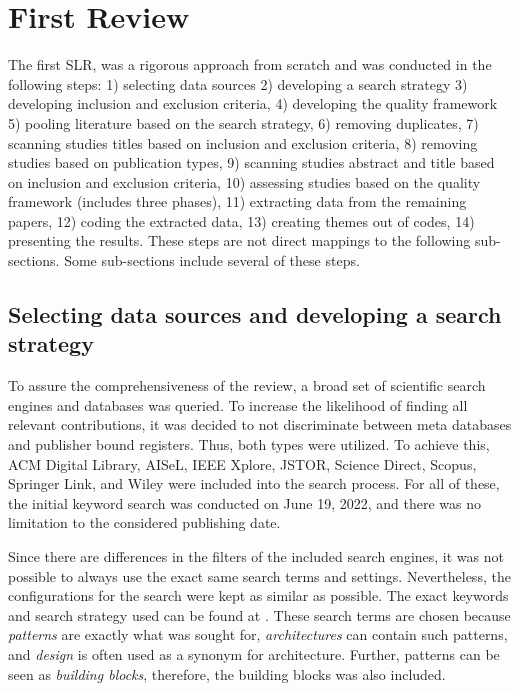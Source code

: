 \documentclass[a4paper,11pt,article,oneside]{memoir}
\begin{document}



\section{First Review}

The first SLR, was a rigorous approach from scratch and was conducted in the following steps: 1) selecting data sources 2) developing a search strategy 3) developing inclusion and exclusion criteria, 4) developing the quality framework 5) pooling literature based on the search strategy, 6) removing duplicates, 7) scanning studies titles based on inclusion and exclusion criteria, 8) removing studies based on publication types, 9) scanning studies abstract and title based on inclusion and exclusion criteria, 10) assessing studies based on the quality framework (includes three phases), 11) extracting data from the remaining papers, 12) coding the extracted data, 13) creating themes out of codes, 14) presenting the results. These steps are not direct mappings to the following sub-sections. Some sub-sections include several of these steps.


\subsection{Selecting data sources and developing a search strategy}

To assure the comprehensiveness of the review, a broad set of scientific search engines and databases was queried. To increase the likelihood of finding all relevant contributions, it was decided to not discriminate between meta databases and publisher bound registers. Thus, both types were utilized. To achieve this, ACM Digital Library, AISeL, IEEE Xplore, JSTOR, Science Direct, Scopus, Springer Link, and Wiley were included into the search process. For all of these, the initial keyword search was conducted on June 19, 2022, and there was no limitation to the considered publishing date.

Since there are differences in the filters of the included search engines, it was not possible to always use the exact same search terms and settings. Nevertheless, the configurations for the search were kept as similar as possible. The exact keywords and search strategy used can be found at \citet{SLRsearchTerms}. These search terms are chosen because \emph{patterns} are exactly what was sought for, \emph{architectures} can contain such patterns, and \emph{design} is often used as a synonym for architecture. Further, patterns can be seen as \emph{building blocks}, therefore, the building blocks was also included. 
\end{document}

